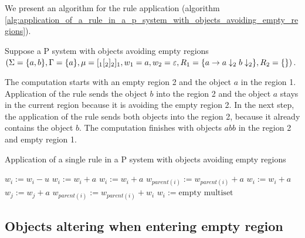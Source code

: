 We present an algorithm for the rule application  (algorithm \ref{alg:application_of_a_rule_in_a_p_system_with_objects_avoiding_empty_regions}).

\begin{example}
  Suppose a P system with objects avoiding empty regions $(\Sigma = \{a,b\}, \Gamma = \{a\}, \mu = [_1[_2]_2]_1, w_1 = a, w_2 = \varepsilon, \\R_1 = \{a\rightarrow a\downarrow_2b\downarrow_2\}, R_2 = \{\})$.

  The computation starts with an empty region 2 and the object $a$ in the region 1. Application of the rule sends the object $b$ into the region 2 and the object $a$ stays in the current region because it is avoiding the empty region 2. In the next step, the application of the rule sends both objects into the region 2, because it already contains the object $b$. The computation finishes with objects $abb$ in the region 2 and empty region 1.
\end{example}

\begin{algorithm}
  \caption{Application of a single rule in a P system with objects avoiding empty regions}\label{alg:application_of_a_rule_in_a_p_system_with_objects_avoiding_empty_regions}
  \begin{algorithmic}[1]
      \State $w_i := w_i - u$
        \State $w_i := w_i + a$
      \EndFor
          \State $w_i := w_i + a$
        \Else
          \State $w_{parent(i)} := w_{parent(i)} + a$
        \EndIf
      \EndFor
          \State $w_i := w_i + a$
        \Else
          \State $w_j := w_j + a$
        \EndIf
      \EndFor
        \State $w_{parent(i)} := w_{parent(i)} + w_i$
        \State $w_i := \text{empty multiset}$
      \EndIf
    \EndProcedure
  \end{algorithmic}
\end{algorithm}


\subsection{Objects altering when entering empty region} %
\label{sub:objects_altering_when_entering_empty_region}


